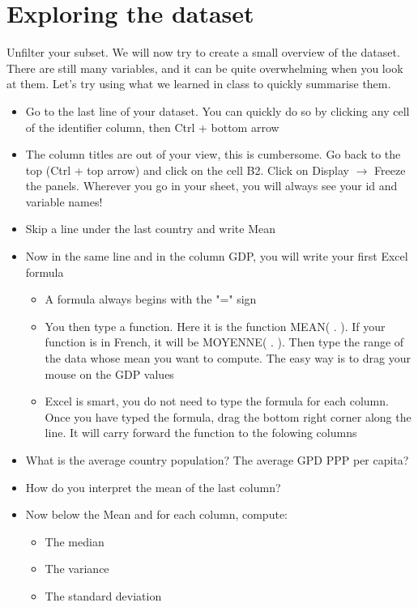 \documentclass{article}
\begin{document}
    \section*{Exploring the dataset}

    Unfilter your subset. We will now try to create a small overview of the dataset. There are still many variables, and it can be quite overwhelming when you look at them. Let's try using what we learned in class to quickly summarise them.
    \begin{itemize}
        \item Go to the last line of your dataset. You can quickly do so by clicking any cell of the identifier column, then Ctrl + bottom arrow
        \item The column titles are out of your view, this is cumbersome. Go back to the top (Ctrl + top arrow) and click on the cell B2. Click on Display $\rightarrow$ Freeze the panels. Wherever you go in your sheet, you will always see your id and variable names!
        \item Skip a line under the last country and write Mean
        \item Now in the same line and in the column GDP, you will write your first Excel formula
        \begin{itemize}
            \item A formula always begins with the "=" sign
            \item You then type a function. Here it is the function MEAN( . ). If your function is in French, it will be MOYENNE( . ). Then type the range of the data whose mean you want to compute. The easy way is to drag your mouse on the GDP values
            \item Excel is smart, you do not need to type the formula for each column. Once you have typed the formula, drag the bottom right corner along the line. It will carry forward the function to the folowing columns
        \end{itemize}
        \item What is the average country population? The average GPD PPP per capita?
        \item How do you interpret the mean of the last column?
        \item 	Now below the Mean and for each column, compute:
        \begin{itemize}
            \item The median
            \item The variance
            \item The standard deviation

\end{itemize}
\end{itemize}
\end{document}
